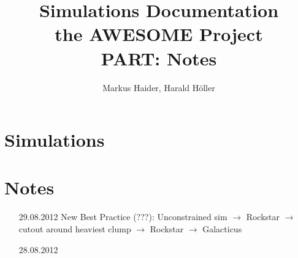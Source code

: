 \documentclass[a4paper,11pt,fleqn,oneside]{book}
\author{Markus Haider, Harald H\"oller}
\begin{document}
\title{\textbf{Simulations Documentation} \\
the AWESOME Project \\
PART: Notes }
\maketitle
\tableofcontents

\chapter{Simulations} 
\chapter{Notes}
\begin{itemize}


\item[29.08.2012]
New Best Practice (???): Unconstrained sim $\rightarrow$ Rockstar $\rightarrow$ cutout around heaviest 
clump $\rightarrow$ Rockstar $\rightarrow$ Galacticus

\item[28.08.2012]


\end{itemize}
\end{document}
